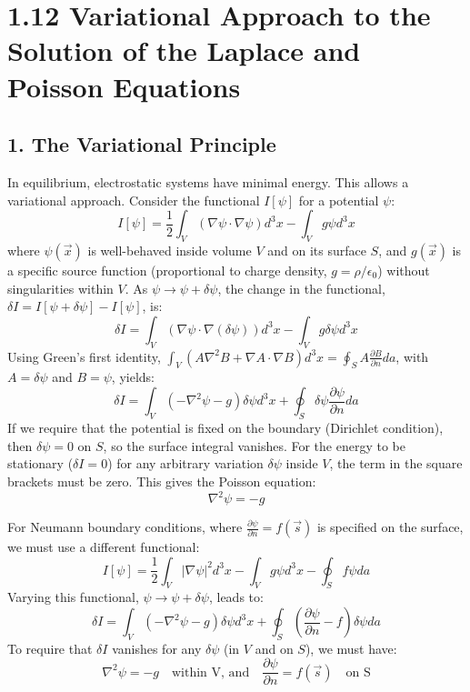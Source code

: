 \documentclass[12pt, a4paper]{article}
\begin{document}
	\section{1.12 Variational Approach to the Solution of the Laplace and Poisson Equations}
	
	\subsection*{1. The Variational Principle}
	
	In equilibrium, electrostatic systems have minimal energy. This allows a variational approach. Consider the functional $I[\psi]$ for a potential $\psi$:
	$$
	I[\psi] = \frac{1}{2} \int_V (\nabla\psi \cdot \nabla\psi) d^3x - \int_V g\psi d^3x
	$$
	where $\psi(\vec{x})$ is well-behaved inside volume $V$ and on its surface $S$, and $g(\vec{x})$ is a specific source function (proportional to charge density, $g = \rho/\epsilon_0$) without singularities within $V$. As $\psi \rightarrow \psi + \delta\psi$, the change in the functional, $\delta I = I[\psi+\delta\psi] - I[\psi]$, is:
	$$
	\delta I = \int_V (\nabla\psi \cdot \nabla(\delta\psi)) d^3x - \int_V g\delta\psi d^3x
	$$
	Using Green's first identity, $\int_V (A \nabla^2 B + \nabla A \cdot \nabla B)d^3x = \oint_S A \frac{\partial B}{\partial n} da$, with $A=\delta\psi$ and $B=\psi$, yields:
	$$
	\delta I = \int_V (-\nabla^2\psi - g)\delta\psi d^3x + \oint_S \delta\psi \frac{\partial\psi}{\partial n} da
	$$
	If we require that the potential is fixed on the boundary (Dirichlet condition), then $\delta\psi = 0$ on $S$, so the surface integral vanishes. For the energy to be stationary ($\delta I = 0$) for any arbitrary variation $\delta\psi$ inside $V$, the term in the square brackets must be zero. This gives the Poisson equation:
	$$
	\nabla^2\psi = -g
	$$
	
	For Neumann boundary conditions, where $\frac{\partial\psi}{\partial n}=f(\vec{s})$ is specified on the surface, we must use a different functional:
	$$
	I[\psi] = \frac{1}{2} \int_V |\nabla\psi|^2 d^3x - \int_V g\psi d^3x - \oint_S f\psi da
	$$
	Varying this functional, $\psi \rightarrow \psi + \delta\psi$, leads to:
	$$
	\delta I = \int_V (-\nabla^2\psi - g)\delta\psi d^3x + \oint_S \left(\frac{\partial\psi}{\partial n} - f\right)\delta\psi da
	$$
	To require that $\delta I$ vanishes for any $\delta\psi$ (in $V$ and on $S$), we must have:
	$$
	\nabla^2\psi = -g \quad \text{within V, and} \quad \frac{\partial\psi}{\partial n} = f(\vec{s}) \quad \text{on S}
	$$
	
\end{document}

